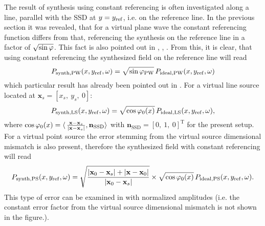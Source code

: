 The result of synthesis using constant referencing is often investigated along a line, parallel with the SSD at $y=y_{\mathrm{ref}}$, i.e. on the reference line. 
In the previous section it was revealed, that for a virtual plane wave the constant referencing function differs from that, referencing the synthesis on the reference line in a factor of $\sqrt{\sin\varphi}$. 
This fact is also pointed out in \cite[(30)]{Ahrens2010a}, \cite[Ch. 3.9.4]{Ahrens2012}, \cite{Schultz2016:DAGA}. 
From this, it is clear, that using constant referencing the synthesized field on the reference line will read
\begin{equation}
P_{\mathrm{synth,PW}}(x,y_{\mathrm{ref}},\omega) = \sqrt{\sin\varphi_\text{PW}} \, P_{\mathrm{ideal,PW}}(x,y_{\mathrm{ref}},\omega) 
\end{equation}
%
which particular result has already been pointed out in \cite[3.9.4]{Ahrens2012}.
For a virtual line source located at $\mathbf{x}_s = [x_s,\ y_s,\ 0]$:
%
\begin{equation}
P_{\mathrm{synth,LS}}(x,y_{\mathrm{ref}},\omega) = \sqrt{\cos\varphi_0(x)} \, P_{\mathrm{ideal,LS}}(x,y_{\mathrm{ref}},\omega),
\end{equation}
where $\cos\varphi_0(x) = \langle\, \frac{\mathbf{x}- \mathbf{x}_s}{|\mathbf{x}- \mathbf{x}_s|}, \mathbf{n}_\text{SSD}\rangle$ with $\mathbf{n}_\text{SSD} = [0,\ 1,\ 0]^{\mathrm{T}}$ for the present setup.
For a virtual point source the error stemming from the virtual source dimensional mismatch is also present, therefore the synthesized field with constant referencing will read
%
\begin{equation}
P_{\mathrm{synth,PS}}(x,y_{\mathrm{ref}},\omega) = \sqrt{\frac{ | \mathbf{x}_0 - \mathbf{x}_s | + | \mathbf{x} - \mathbf{x}_0| }{ | \mathbf{x}_0 - \mathbf{x}_s |}} \times
\sqrt{\cos\varphi_0(x)} \, P_{\mathrm{ideal,PS}}(x,y_{\mathrm{ref}},\omega).
\end{equation}
%
This type of error can be examined in \cite[Fig.5.13.]{Ahrens2012} with normalized amplitudes (i.e. the constant error factor from the virtual source dimensional mismatch is not shown in the figure.).

